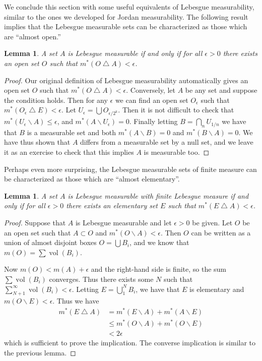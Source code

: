 \documentclass[11pt,oneside]{amsbook}
\renewcommand{\setminus}{\smallsetminus}
\renewcommand{\triangle}{\bigtriangleup}
\DeclareMathOperator{\vol}{vol}
\theoremstyle{definition}
\theoremstyle{plain}
\newtheorem{lem}[thm]{Lemma}
\theoremstyle{definition}
\theoremstyle{remark}
\numberwithin{equation}{section}
\numberwithin{figure}{section}
\begin{document}
We conclude this section with some useful equivalents of Lebesgue measurability, similar to the ones we developed for Jordan measurability. The following result implies that the Lebesgue measurable sets can be characterized as those which are ``almost open.''

\begin{lem}
  A set $A$ is Lebesgue measurable if and only if for all $\epsilon>0$ there exists an open set $O$ such that $m^*(O\triangle A)<\epsilon$.
\end{lem}

\begin{proof}
  Our original definition of Lebesgue measurability automatically gives an open set $O$ such that $m^*(O\triangle A)<\epsilon$. Conversely, let $A$ be any set and suppose the condition holds. Then for any $\epsilon$ we can find an open set $O_\epsilon$ such that $m^*(O_\epsilon\triangle E)<\epsilon$. Let $U_\epsilon=\bigcup O_{\epsilon/2^k}$. Then it is not difficult to check that $m^*(U_\epsilon\setminus A)\leq\epsilon$, and $m^*(A\setminus U_\epsilon)=0$. Finally letting $B=\bigcap_nU_{1/n}$ we have that $B$ is a measurable set and both $m^*(A\setminus B)=0$ and $m^*(B\smallsetminus A)=0$. We have thus shown that $A$ differs from a measurable set by a null set, and we leave it as an exercise to check that this implies $A$ is measurable too.
\end{proof}

Perhaps even more surprising, the Lebesgue measurable sets of finite measure can be characterized as those which are ``almost elementary''.

\begin{lem}
  A set $A$ is Lebesgue measurable with finite Lebesgue measure if and only if for all $\epsilon>0$ there exists an elementary set $E$ such that $m^*(E\triangle A)<\epsilon$.
\end{lem}

\begin{proof}
  Suppose that $A$ is Lebesgue measurable and let $\epsilon>0$ be given. Let $O$ be an open set such that $A\subset O$ and $m^*(O\setminus A)<\epsilon$. Then $O$ can be written as a union of almost disjoint boxes $O=\bigcup B_i$, and we know that $m(O)=\sum\vol(B_i)$.

  Now $m(O)<m(A)+\epsilon$ and the right-hand side is finite, so the sum $\sum\vol(B_i)$ converges. Thus there exists some $N$ such that $\sum_{N+1}^\infty\vol(B_i)<\epsilon$. Letting $E=\bigcup_1^N B_i$, we have that $E$ is elementary and $m(O\setminus E)<\epsilon$. Thus we have
  \begin{align*}
    m^*(E\triangle A)&=m^*(E\setminus A)+m^*(A\setminus E)\\
                     &\leq m^*(O\setminus A)+m^*(O\setminus E)\\
                     &<2\epsilon
  \end{align*}
  which is sufficient to prove the implication. The converse implication is similar to the previous lemma.
\end{proof}
\end{document}
